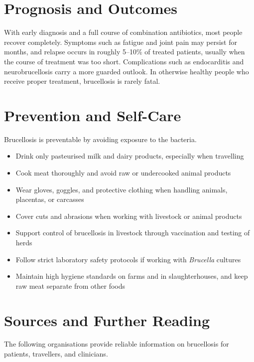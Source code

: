 \section*{Prognosis and Outcomes}
With early diagnosis and a full course of combination antibiotics, most people recover completely. Symptoms such as fatigue and joint pain may persist for months, and relapse occurs in roughly 5--10\% of treated patients, usually when the course of treatment was too short. Complications such as endocarditis and neurobrucellosis carry a more guarded outlook. In otherwise healthy people who receive proper treatment, brucellosis is rarely fatal.

\section*{Prevention and Self-Care}
Brucellosis is preventable by avoiding exposure to the bacteria.

\begin{itemize}
    \item Drink only pasteurised milk and dairy products, especially when travelling
    \item Cook meat thoroughly and avoid raw or undercooked animal products
    \item Wear gloves, goggles, and protective clothing when handling animals, placentas, or carcasses
    \item Cover cuts and abrasions when working with livestock or animal products
    \item Support control of brucellosis in livestock through vaccination and testing of herds
    \item Follow strict laboratory safety protocols if working with \textit{Brucella} cultures
    \item Maintain high hygiene standards on farms and in slaughterhouses, and keep raw meat separate from other foods
\end{itemize}

\section*{Sources and Further Reading}
The following organisations provide reliable information on brucellosis for patients, travellers, and clinicians.

